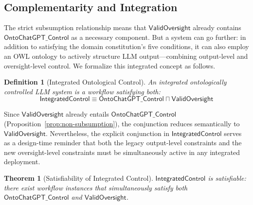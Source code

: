 \documentclass[11pt]{article}
\newtheorem{definition}{Definition}[section]
\newtheorem{theorem}{Theorem}[section]
\begin{document}
\subsection{Complementarity and Integration}
\label{sec:complementarity}

The strict subsumption relationship means that $\mathsf{ValidOversight}$ already contains $\mathsf{OntoChatGPT\_Control}$ as a necessary component.
But a system can go further: in addition to satisfying the domain constitution's five conditions, it can also employ an OWL ontology to actively structure LLM output---combining output-level and oversight-level control.
We formalize this integrated concept as follows.

\begin{definition}[Integrated Ontological Control]
\label{def:integrated}
An \emph{integrated ontologically controlled LLM system} is a workflow satisfying both:
\begin{equation}
  \mathsf{IntegratedControl} \equiv \mathsf{OntoChatGPT\_Control} \sqcap \mathsf{ValidOversight}
\end{equation}
\end{definition}

Since $\mathsf{ValidOversight}$ already entails $\mathsf{OntoChatGPT\_Control}$ (Proposition~\ref{prop:non-subsumption}), the conjunction reduces semantically to $\mathsf{ValidOversight}$.
Nevertheless, the explicit conjunction in $\mathsf{IntegratedControl}$ serves as a design-time reminder that both the legacy output-level constraints and the new oversight-level constraints must be simultaneously active in any integrated deployment.

\begin{theorem}[Satisfiability of Integrated Control]
\label{thm:integrated}
$\mathsf{IntegratedControl}$ is satisfiable: there exist workflow instances that simultaneously satisfy both $\mathsf{OntoChatGPT\_Control}$ and $\mathsf{ValidOversight}$.
\end{theorem}
\end{document}
